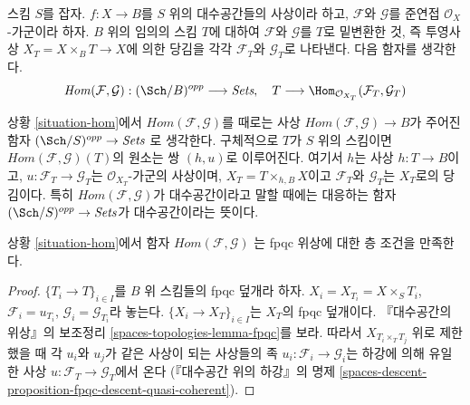 \begin{situation}
\label{situation-hom}
스킴 $S$를 잡자. $f : X \to B$를 $S$ 위의 대수공간들의 사상이라
하고, $\mathcal{F}$와 $\mathcal{G}$를 준연접
$\mathcal{O}_X$-가군이라 하자. $B$ 위의 임의의 스킴 $T$에 대하여
$\mathcal{F}$와 $\mathcal{G}$를 $T$로 밑변환한 것, 즉 투영사상
$X_T = X \times_B T \to X$에 의한 당김을 각각
$\mathcal{F}_T$와 $\mathcal{G}_T$로 나타낸다.
다음 함자를 생각한다.
\begin{equation}
\label{equation-hom}
\mathit{Hom}(\mathcal{F}, \mathcal{G}) :
(\Sch/B)^{opp}
\longrightarrow
\textit{Sets},\quad
T
\longrightarrow
\Hom_{\mathcal{O}_{X_T}}(\mathcal{F}_T, \mathcal{G}_T)
\end{equation}
\end{situation}

\noindent
상황 \ref{situation-hom}에서
$\mathit{Hom}(\mathcal{F}, \mathcal{G})$를 때로는 사상
$\mathit{Hom}(\mathcal{F}, \mathcal{G}) \to B$가 주어진 함자
$(\Sch/S)^{opp} \to \textit{Sets}$
로 생각한다. 구체적으로 $T$가 $S$ 위의 스킴이면
$\mathit{Hom}(\mathcal{F}, \mathcal{G})(T)$의 원소는 쌍
$(h, u)$로 이루어진다. 여기서 $h$는 사상 $h : T \to B$이고,
$u : \mathcal{F}_T \to \mathcal{G}_T$는
$\mathcal{O}_{X_T}$-가군의 사상이며,
$X_T = T \times_{h, B} X$이고 $\mathcal{F}_T$와
$\mathcal{G}_T$는 $X_T$로의 당김이다. 특히
$\mathit{Hom}(\mathcal{F}, \mathcal{G})$가 대수공간이라고 말할 때에는
대응하는 함자 $(\Sch/S)^{opp} \to \textit{Sets}$가
대수공간이라는 뜻이다.

\begin{lemma}
\label{lemma-hom-sheaf}
상황 \ref{situation-hom}에서 함자
$\mathit{Hom}(\mathcal{F}, \mathcal{G})$ 
는 fpqc 위상에 대한 층 조건을 만족한다.
\end{lemma}

\begin{proof}
 $\{T_i \to T\}_{i \in I}$를 $B$ 위 스킴들의 fpqc 덮개라 하자.
$X_i = X_{T_i} = X \times_S T_i$, $\mathcal{F}_i = u_{T_i}$,
$\mathcal{G}_i = \mathcal{G}_{T_i}$라 놓는다.
$\{X_i \to X_T\}_{i \in I}$는 $X_T$의 fpqc 덮개이다.
『대수공간의 위상』의 보조정리
\ref{spaces-topologies-lemma-fpqc}를 보라. 따라서
$X_{T_i \times_T T_j}$ 위로 제한했을 때 각 $u_i$와 $u_j$가
같은 사상이 되는 사상들의 족
$u_i : \mathcal{F}_i \to \mathcal{G}_i$는 하강에 의해 유일한 사상
$u : \mathcal{F}_T \to \mathcal{G}_T$에서 온다
(『대수공간 위의 하강』의 명제
\ref{spaces-descent-proposition-fpqc-descent-quasi-coherent}).
\end{proof}

